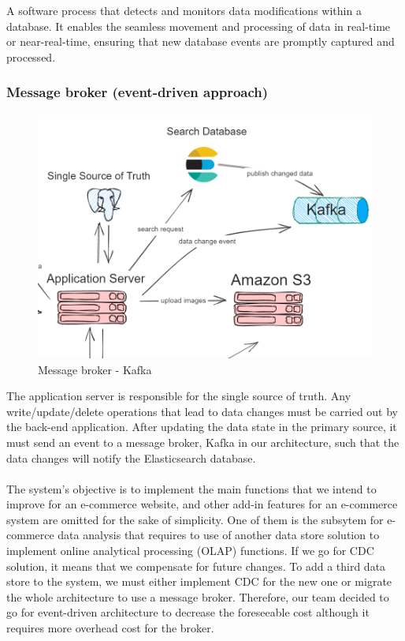  A software process that detects and monitors data modifications within a database. It enables the seamless movement and processing of data in real-time or near-real-time, ensuring that new database events are promptly captured and processed.

\subsubsection{Message broker (event-driven approach)}

\begin{figure}[H]
    \centering
    \includegraphics[width=0.7\linewidth]{image/Architecture/kafka.png}
    \caption{Message broker - Kafka}
    \label{fig:enter-label}
\end{figure}

\noindent The application server is responsible for the single source of truth. Any write/update/delete operations that lead to data changes must be carried out by the back-end application. After updating the data state in the primary source, it must send an event to a message broker, Kafka in our architecture, such that the data changes will notify the Elasticsearch database. \\ \\
The system’s objective is to implement the main functions that we intend to improve for an e-commerce website, and other add-in features for an e-commerce system are omitted for the sake of simplicity. One of them is the subsytem for e-commerce data analysis that requires to use of another data store solution to implement online analytical processing (OLAP) functions. If we go for CDC solution, it means that we compensate for future changes. To add a third data store to the system, we must either implement CDC for the new one or migrate the whole architecture to use a message broker. Therefore, our team decided to go for event-driven architecture to decrease the foreseeable cost although it requires more overhead cost for the broker.\\

